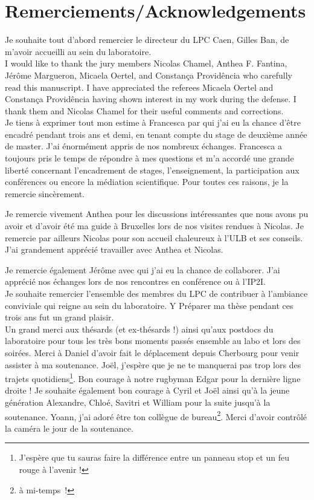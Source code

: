 \chapter*{Remerciements/Acknowledgements}

Je souhaite tout d'abord remercier le directeur du LPC Caen, Gilles Ban, de
m'avoir accueilli au sein du laboratoire.\\

I would like to thank the jury members Nicolas Chamel, Anthea F. Fantina, 
Jérôme Margueron, Micaela Oertel, and Constança Providência who carefully read
this manuscript. I have appreciated the referees Micaela Oertel and Constança 
Providência having shown interest in my work during the defense. I thank them 
and Nicolas Chamel for their useful comments and corrections.\\

Je tiens à exprimer tout mon estime à Francesca par qui j'ai eu la chance 
d'être encadré pendant trois ans et demi, en tenant compte du stage de deuxième 
année de master. J'ai énormément appris de nos nombreux échanges. 
Francesca a toujours pris le temps de répondre à mes questions et m'a accordé
une grande liberté concernant l'encadrement de stages, l'enseignement, la
participation aux conférences ou encore la médiation scientifique. 
Pour toutes ces raisons, je la remercie sincèrement.

Je remercie vivement Anthea pour les discussions intéressantes que
nous avons pu avoir et d'avoir été ma guide à Bruxelles lors de nos visites 
rendues à Nicolas. Je remercie par ailleurs Nicolas pour son accueil chaleureux 
à l'ULB et ses conseils. J'ai grandement apprécié travailler avec Anthea et 
Nicolas. 

Je remercie également Jérôme avec qui j'ai eu la chance de collaborer. J'ai 
apprécié nos échanges lors de nos rencontres en conférence ou à l'IP2I.\\

Je souhaite remercier l'ensemble des membres du LPC de contribuer à
l'ambiance conviviale qui reigne au sein du laboratoire. 
Y Préparer ma thèse pendant ces trois ans fut un grand plaisir.\\

Un grand merci aux thésards (et ex-thésards !) ainsi qu'aux postdocs du 
laboratoire pour tous les très bons moments passés ensemble au labo et lors 
des soirées. Merci à Daniel d'avoir fait le déplacement depuis Cherbourg pour 
venir assister à ma soutenance. 
Joël, j'espère que je ne te manquerai pas trop lors des trajets
quotidiens\footnote{J'espère que tu sauras faire la différence entre un panneau 
stop et un feu rouge à l'avenir !}. Bon courage à notre rugbyman Edgar pour la 
dernière ligne droite ! 
Je souhaite également bon courage à Cyril et Joël ainsi qu'à la jeune 
génération Alexandre, Chloé, Savitri et William pour la suite jusqu'à la 
soutenance. 
Yoann, j'ai adoré être ton collègue de bureau\footnote{à mi-temps~!}. Merci 
d'avoir contrôlé la caméra le jour de la soutenance.


